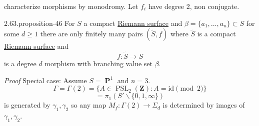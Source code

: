 \documentclass[10pt,]{book}
\makeatletter
\renewcommand*{\proofname}{Proof}
\renewenvironment{proof}[1][\proofname]{\par
  \pushQED{\qed}%
  \normalfont \topsep6\p@\@plus6\p@\relax
  \trivlist
  \item\relax
    {\itshape
    #1\@addpunct{.}}\hspace\labelsep\ignorespaces
}{%
  \popQED\endtrivlist\@endpefalse
}
\numberwithin{equation}{section}
\newcommand{\ZZ}{\mathbf{Z}}
\newcommand{\id}{\mathrm{id}}
\DeclareMathOperator{\PP}{\mathbf{P}}
\DeclareMathOperator{\PSL}{PSL}
\makeatother
\begin{document}
characterize morphisms by monodromy. Let \(f_i\) have degree 2, non conjugate.%
\begin{proposition}{2.63.}{}{proposition-46}%
\hypertarget{p-583}{}%
For \(S\) a compact \hyperref[def-top-riem-surface]{Riemann surface} and \(\beta = \{ a_1, \ldots, a_n\} \subset S\) for some \(d \ge 1\) there are only finitely many pairs \((\tilde S, f)\) where \(\tilde S\) is a compact \hyperref[def-top-riem-surface]{Riemann surface} and%
\begin{equation*}
f\colon \tilde S \to S
\end{equation*}
is a degree \(d\) morphism with branching  value set \(\beta\).%
\end{proposition}
\begin{proof}\hypertarget{proof-91}{}
\hypertarget{p-584}{}%
Special case: Assume \(S = \PP^1\) and \(n=3\).%
\begin{equation*}
\Gamma = \Gamma(2) = \{ A \in \PSL_2(\ZZ) : A = \id \pmod 2\}
\end{equation*}
%
\begin{equation*}
= \pi_1 (S' \smallsetminus \{0,1,\infty\})
\end{equation*}
is generated by \(\gamma_1, \gamma_2\) so any map \(M_f \colon \Gamma(2) \to \Sigma_d\) is determined by  images of \(\gamma_1, \gamma_2\).%
\end{proof}
%
%
\typeout{************************************************}
\typeout{************************************************}
%
\end{document}
